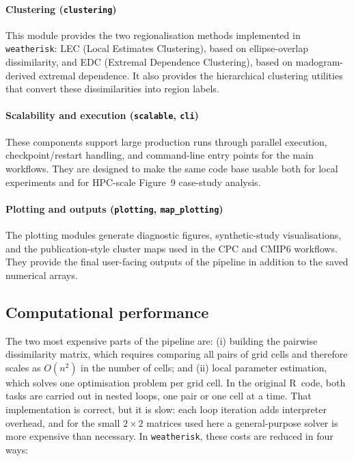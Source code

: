 \documentclass[preprint,12pt,a4paper]{elsarticle}
\newcommand{\revb}[1]{{\color{RevisionBlue}#1}}
\newcommand{\revo}[1]{{\color{RevisionOrange}#1}}
\begin{document}
\paragraph{Clustering (\texttt{clustering})}
This module provides the two regionalisation methods implemented in
\texttt{weatherisk}: LEC (Local Estimates Clustering), based on
ellipse-overlap dissimilarity, and EDC (Extremal Dependence
Clustering), based on madogram-derived extremal dependence. It also provides
the hierarchical clustering utilities that convert these
dissimilarities into region labels.

\paragraph{Scalability and execution (\texttt{scalable}, \texttt{cli})}
These components support large production runs through parallel
execution, checkpoint/restart handling, and command-line entry points
for the main workflows. They are designed to make the same code base
usable both for local experiments and for HPC-scale Figure~9
\revb{case-study analysis}.

\paragraph{Plotting and outputs (\texttt{plotting}, \texttt{map\_plotting})}
The plotting modules generate diagnostic figures, synthetic-study
visualisations, and the publication-style cluster maps used in the CPC
and CMIP6 workflows. They provide the final user-facing outputs of the
pipeline in addition to the saved numerical arrays.

\subsection{Computational performance}
\label{sec:performance}

\revo{The two most expensive parts of the pipeline are: (i) building the
pairwise dissimilarity matrix, which requires comparing all pairs of grid
cells and therefore scales as $O(n^2)$ in the number of cells; and (ii) local
parameter estimation, which solves one optimisation problem per grid cell.
In the original R~code, both tasks are carried out in nested loops,
one pair or one cell at a time. That implementation is correct, but
it is slow: each loop iteration adds interpreter overhead, and for
the small $2\times 2$ matrices used here a general-purpose solver is
more expensive than necessary. In \texttt{weatherisk}, these costs
are reduced in four ways:}
\end{document}
